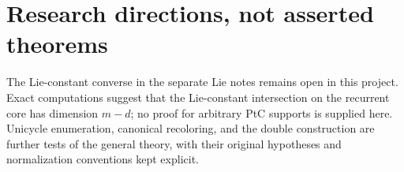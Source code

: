 
\section{Research directions, not asserted theorems}
The Lie-constant converse in the separate Lie notes remains open in this
project. Exact computations suggest that the Lie-constant intersection on
the recurrent core has dimension $m-d$; no proof for arbitrary PtC supports
is supplied here. Unicycle enumeration, canonical recoloring, and the double
construction are further tests of the general theory, with their original
hypotheses and normalization conventions kept explicit.
